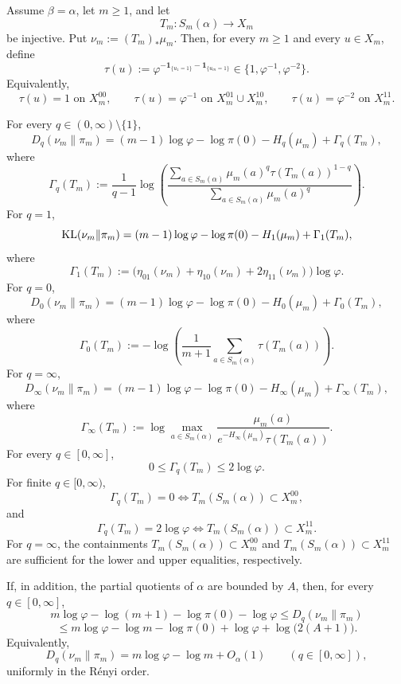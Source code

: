 \begin{theorem}
\label{thm:lossless-coarse-graining-envelope}
Assume \(\beta=\alpha\), let \(m\ge1\), and let
\[
T_m:S_m(\alpha)\longrightarrow X_m
\]
be injective. Put \(\nu_m:=(T_m)_*\mu_m\). Then, for every \(m\ge1\) and every
\(u\in X_m\), define
\[
\tau(u):=\varphi^{-\mathbf 1_{\{u_1=1\}}-\mathbf 1_{\{u_m=1\}}}
\in \{1,\varphi^{-1},\varphi^{-2}\}.
\]
Equivalently,
\[
\tau(u)=1 \text{ on } X_m^{00},\qquad
\tau(u)=\varphi^{-1} \text{ on } X_m^{01}\cup X_m^{10},\qquad
\tau(u)=\varphi^{-2} \text{ on } X_m^{11}.
\]

For every \(q\in(0,\infty)\setminus\{1\}\),
\[
D_q(\nu_m\|\pi_m)
=
(m-1)\log\varphi-\log\pi(0)-H_q(\mu_m)+\Gamma_q(T_m),
\]
where
\[
\Gamma_q(T_m):=
\frac{1}{q-1}
\log\!\left(
\frac{\sum_{a\in S_m(\alpha)}\mu_m(a)^q\tau(T_m(a))^{1-q}}
{\sum_{a\in S_m(\alpha)}\mu_m(a)^q}
\right).
\]
For \(q=1\),
\[
\operatorname{KL}(\nu_m\|\pi_m)
=
(m-1)\log\varphi-\log\pi(0)-H_1(\mu_m)+\Gamma_1(T_m),
\]
where
\[
\Gamma_1(T_m):=
\bigl(
\eta_{01}(\nu_m)+\eta_{10}(\nu_m)+2\eta_{11}(\nu_m)
\bigr)\log\varphi.
\]
For \(q=0\),
\[
D_0(\nu_m\|\pi_m)
=
(m-1)\log\varphi-\log\pi(0)-H_0(\mu_m)+\Gamma_0(T_m),
\]
where
\[
\Gamma_0(T_m):=
-\log\!\left(
\frac{1}{m+1}\sum_{a\in S_m(\alpha)}\tau(T_m(a))
\right).
\]
For \(q=\infty\),
\[
D_\infty(\nu_m\|\pi_m)
=
(m-1)\log\varphi-\log\pi(0)-H_\infty(\mu_m)+\Gamma_\infty(T_m),
\]
where
\[
\Gamma_\infty(T_m):=
\log\max_{a\in S_m(\alpha)}
\frac{\mu_m(a)}
{e^{-H_\infty(\mu_m)}\tau(T_m(a))}.
\]
For every \(q\in[0,\infty]\),
\[
0\le \Gamma_q(T_m)\le 2\log\varphi.
\]
For finite \(q\in[0,\infty)\),
\[
\Gamma_q(T_m)=0
\iff
T_m(S_m(\alpha))\subset X_m^{00},
\]
and
\[
\Gamma_q(T_m)=2\log\varphi
\iff
T_m(S_m(\alpha))\subset X_m^{11}.
\]
For \(q=\infty\), the containments \(T_m(S_m(\alpha))\subset X_m^{00}\) and
\(T_m(S_m(\alpha))\subset X_m^{11}\) are sufficient for the lower and upper
equalities, respectively.

If, in addition, the partial quotients of \(\alpha\) are bounded by \(A\),
then, for every \(q\in[0,\infty]\),
\[
m\log\varphi-\log(m+1)-\log\pi(0)-\log\varphi
\le
D_q(\nu_m\|\pi_m)
\]
\[
\le
m\log\varphi-\log m-\log\pi(0)
+
\log\varphi+\log\!\bigl(2(A+1)\bigr).
\]
Equivalently,
\[
D_q(\nu_m\|\pi_m)=m\log\varphi-\log m+O_\alpha(1)
\qquad (q\in[0,\infty]),
\]
uniformly in the R\'enyi order.
\end{theorem}

